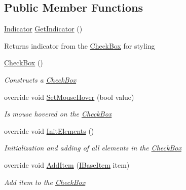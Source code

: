 \subsection*{Public Member Functions}
\begin{DoxyCompactItemize}
\item 
\mbox{\label{class_space_v_i_l_1_1_check_box_a44665e6332185f9f0aa3fa64b133b6a6}} 
\mbox{\hyperlink{class_space_v_i_l_1_1_indicator}{Indicator}} \mbox{\hyperlink{class_space_v_i_l_1_1_check_box_a44665e6332185f9f0aa3fa64b133b6a6}{Get\+Indicator}} ()
\begin{DoxyCompactList}\small\item\em \begin{DoxyReturn}{Returns}
indicator from the \mbox{\hyperlink{class_space_v_i_l_1_1_check_box}{Check\+Box}} for styling 
\end{DoxyReturn}
\end{DoxyCompactList}\item 
\mbox{\hyperlink{class_space_v_i_l_1_1_check_box_ac4cc39e7a28c54aa260902b2d742e0e8}{Check\+Box}} ()
\begin{DoxyCompactList}\small\item\em Constructs a \mbox{\hyperlink{class_space_v_i_l_1_1_check_box}{Check\+Box}} \end{DoxyCompactList}\item 
override void \mbox{\hyperlink{class_space_v_i_l_1_1_check_box_a25dadac18b060b665065ddc3cb6b91bd}{Set\+Mouse\+Hover}} (bool value)
\begin{DoxyCompactList}\small\item\em Is mouse hovered on the \mbox{\hyperlink{class_space_v_i_l_1_1_check_box}{Check\+Box}} \end{DoxyCompactList}\item 
override void \mbox{\hyperlink{class_space_v_i_l_1_1_check_box_a5e4b6ce5dd4e68da0cf678025a7fb0fb}{Init\+Elements}} ()
\begin{DoxyCompactList}\small\item\em Initialization and adding of all elements in the \mbox{\hyperlink{class_space_v_i_l_1_1_check_box}{Check\+Box}} \end{DoxyCompactList}\item 
override void \mbox{\hyperlink{class_space_v_i_l_1_1_check_box_a4effb830a35810780edb874d9ba05cfe}{Add\+Item}} (\mbox{\hyperlink{interface_space_v_i_l_1_1_core_1_1_i_base_item}{I\+Base\+Item}} item)
\begin{DoxyCompactList}\small\item\em Add item to the \mbox{\hyperlink{class_space_v_i_l_1_1_check_box}{Check\+Box}} \end{DoxyCompactList}\item 

\end{DoxyCompactItemize}
